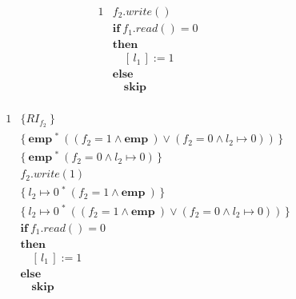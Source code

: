 \documentclass[12pt]{article}
\newcommand{\ifstmt}[3]{
  & \textbf{if}\ #1 \\
  & \textbf{then}\ \\
  & \quad #2\ \\
  & \textbf{else} \\
  & \quad #3
}
\newcommand{\emp}{
  \textbf{emp}\
}
\begin{document}
\begin{alignat*}{1}
  &  f_2.write() \\
  \ifstmt{f_1.read() = 0}{[\,l_1\,] := 1}{\textbf{skip}} \\
\end{alignat*}

\begin{alignat*}{1}
  & \{ RI_{f_2}\ \} \\
  & \{\ \emp ^*\ (( f_2 = 1 \land \emp) \lor ( f_2 = 0 \land l_2 \mapsto 0 ))\,\} \\
  & \{\ \emp ^*\ (f_2 = 0 \land l_2 \mapsto 0 )\,\} \\
  &  f_2.write( 1 ) \\
  & \{\ l_2 \mapsto 0\ ^*\ (f_2 = 1 \land \emp )\,\} \\
  & \{\ l_2 \mapsto 0\ ^*\ (( f_2 = 1 \land \emp) \lor ( f_2 = 0 \land l_2 \mapsto 0 ))\,\} \\
  \ifstmt{f_1.read() = 0}{[\,l_1\,] := 1}{\textbf{skip}} \\
\end{alignat*}
\end{document}
